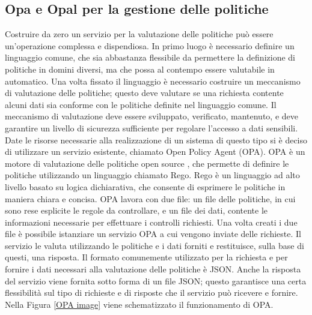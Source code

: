 \documentclass[12pt]{report}
\begin{document}
\subsection{Opa e Opal per la gestione delle politiche}\label{opa_opal}
Costruire da zero un servizio per la valutazione delle politiche può essere un'operazione complessa e dispendiosa.
In primo luogo è necessario definire un linguaggio comune, che sia abbastanza flessibile da permettere la definizione di politiche in domini diversi, ma che possa al contempo essere valutabile in automatico.
Una volta fissato il linguaggio è necessario costruire un meccanismo di valutazione delle politiche; questo deve valutare se una richiesta contente alcuni dati sia conforme con le politiche definite nel linguaggio comune. 
Il meccanismo di valutazione deve essere sviluppato, verificato, mantenuto, e deve garantire un livello di sicurezza sufficiente per regolare l'accesso a dati sensibili.
Date le risorse necessarie alla realizzazione di un sistema di questo tipo si è deciso di utilizzare un servizio esistente, chiamato Open Policy Agent (OPA).
OPA è un motore di valutazione delle politiche open source \cite{noauthor_open_nodate}, che permette di definire le politiche utilizzando un linguaggio chiamato Rego.
Rego è un linguaggio ad alto livello basato su logica dichiarativa, che consente di esprimere le politiche in maniera chiara e concisa.
OPA lavora con due file: un file delle politiche, in cui sono rese esplicite le regole da controllare, e un file dei dati, contente le informazioni necessarie per effettuare i controlli richiesti.
Una volta creati i due file è possibile istanziare un servizio OPA a cui vengono inviate delle richieste.
Il servizio le valuta utilizzando le politiche e i dati forniti e restituisce, sulla base di questi, una risposta.
Il formato comunemente utilizzato per la richiesta e per fornire i dati necessari alla valutazione delle politiche è JSON.
Anche la risposta del servizio viene fornita sotto forma di un file JSON; questo garantisce una certa flessibilità sul tipo di richieste e di risposte che il servizio può ricevere e  fornire.
Nella Figura \ref{OPA image} viene schematizzato il funzionamento di OPA.
\end{document}
